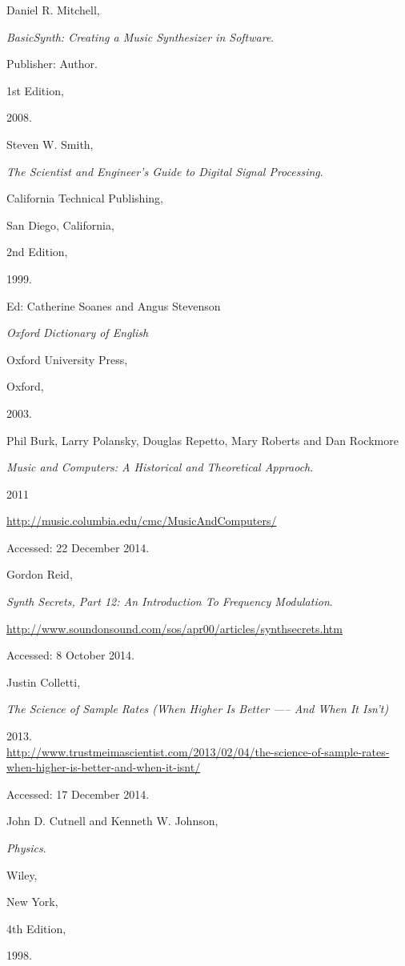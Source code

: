 \documentclass[12pt,twoside]{report}
\begin{document}
\begin{thebibliography}{9}


Daniel R. Mitchell,

\emph{BasicSynth: Creating a Music Synthesizer in Software}.

Publisher: Author.

1st Edition,

2008.


Steven W. Smith,

\emph{The Scientist and Engineer's Guide to Digital Signal Processing}.

California Technical Publishing,

San Diego, California,

2nd Edition,

1999.


Ed: Catherine Soanes and Angus Stevenson

\emph{Oxford Dictionary of English}

Oxford University Press,

Oxford,

2003.


Phil Burk, Larry Polansky, Douglas Repetto, Mary Roberts and Dan Rockmore

\emph{Music and Computers: A Historical and Theoretical Appraoch}.

2011

\url{http://music.columbia.edu/cmc/MusicAndComputers/}

Accessed: 22 December 2014.


Gordon Reid,

\emph{Synth Secrets, Part 12: An Introduction To Frequency Modulation}.

\url{http://www.soundonsound.com/sos/apr00/articles/synthsecrets.htm}

Accessed: 8 October 2014.


Justin Colletti,

\emph{The Science of Sample Rates (When Higher Is Better —-- And When It Isn't)}

2013.\\
  \url{http://www.trustmeimascientist.com/2013/02/04/the-science-of-sample-rates-when-higher-is-better-and-when-it-isnt/}

Accessed: 17 December 2014.


John D. Cutnell and Kenneth W. Johnson,

\emph{Physics}.

Wiley,

New York,

4th Edition,

1998.

\end{thebibliography}

\listoffigures
\end{document}
